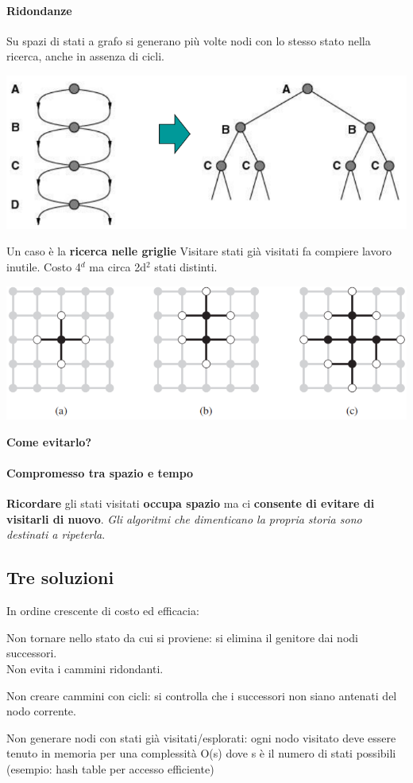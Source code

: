 \documentclass[10pt]{book}
\begin{document}
\paragraph{Ridondanze}
Su spazi di stati a grafo si generano più volte nodi con lo stesso stato nella ricerca, anche in assenza di cicli.
\begin{center}
	\includegraphics[scale=0.7]{ridondanze.png}
\end{center}
\pagebreak
Un caso è la \textbf{ricerca nelle griglie} Visitare stati già visitati fa compiere lavoro inutile. Costo 4$^d$ ma circa 2d$^2$ stati distinti.
\begin{center}
	\includegraphics[scale=0.7]{griglie.png}
\end{center}
\textbf{Come evitarlo?}
\paragraph{Compromesso tra spazio e tempo} \textbf{Ricordare} gli stati visitati \textbf{occupa spazio} ma ci \textbf{consente di evitare di visitarli di nuovo}. \textit{Gli algoritmi che dimenticano la propria storia sono destinati a ripeterla}.
\subsection{Tre soluzioni} In ordine crescente di costo ed efficacia:
\begin{list}{}{}
	\item Non tornare nello stato da cui si proviene: si elimina il genitore dai nodi successori.\\
	Non evita i cammini ridondanti.
	\item Non creare cammini con cicli: si controlla che i successori non siano antenati del nodo corrente.
	\item Non generare nodi con stati già visitati/esplorati: ogni nodo visitato deve essere tenuto in memoria per una complessità O(s) dove s è il numero di stati possibili (esempio: hash table per accesso efficiente)
\end{list}
\end{document}
